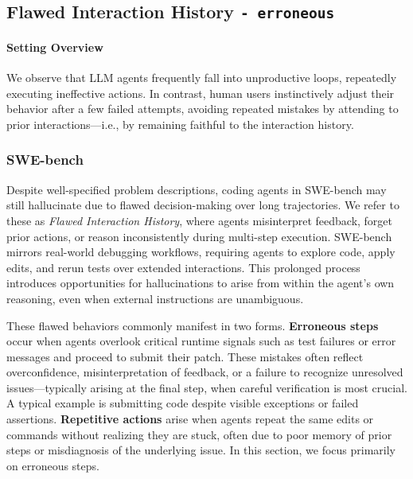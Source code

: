 
\subsection{Flawed Interaction History \texttt{- erroneous}}
\paragraph{Setting Overview}

We observe that LLM agents frequently fall into unproductive loops, repeatedly executing ineffective actions. In contrast, human users instinctively adjust their behavior after a few failed attempts, avoiding repeated mistakes by attending to prior interactions---i.e., by remaining faithful to the interaction history.

\subsubsection{SWE-bench}

Despite well-specified problem descriptions, coding agents in SWE-bench may still hallucinate due to flawed decision-making over long trajectories. We refer to these as \textit{Flawed Interaction History}, where agents misinterpret feedback, forget prior actions, or reason inconsistently during multi-step execution. SWE-bench mirrors real-world debugging workflows, requiring agents to explore code, apply edits, and rerun tests over extended interactions. This prolonged process introduces opportunities for hallucinations to arise from within the agent's own reasoning, even when external instructions are unambiguous.

These flawed behaviors commonly manifest in two forms. \textbf{Erroneous steps} occur when agents overlook critical runtime signals such as test failures or error messages and proceed to submit their patch. These mistakes often reflect overconfidence, misinterpretation of feedback, or a failure to recognize unresolved issues---typically arising at the final step, when careful verification is most crucial. A typical example is submitting code despite visible exceptions or failed assertions. \textbf{Repetitive actions} arise when agents repeat the same edits or commands without realizing they are stuck, often due to poor memory of prior steps or misdiagnosis of the underlying issue. In this section, we focus primarily on erroneous steps.

